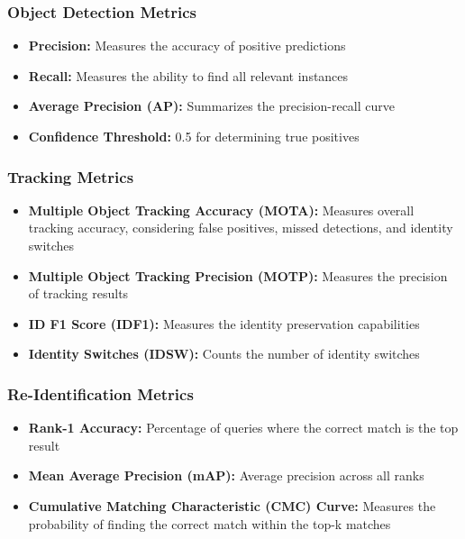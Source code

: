\subsubsection{Object Detection Metrics}
\label{subsubsection:detection-metrics}

\begin{itemize}
    \item \textbf{Precision:} Measures the accuracy of positive predictions
    \item \textbf{Recall:} Measures the ability to find all relevant instances
    \item \textbf{Average Precision (AP):} Summarizes the precision-recall curve
    \item \textbf{Confidence Threshold:} 0.5 for determining true positives
\end{itemize}

\subsubsection{Tracking Metrics}
\label{subsubsection:tracking-metrics}

\begin{itemize}
    \item \textbf{Multiple Object Tracking Accuracy (MOTA):} Measures overall tracking accuracy, considering false positives, missed detections, and identity switches
    \item \textbf{Multiple Object Tracking Precision (MOTP):} Measures the precision of tracking results
    \item \textbf{ID F1 Score (IDF1):} Measures the identity preservation capabilities
    \item \textbf{Identity Switches (IDSW):} Counts the number of identity switches
\end{itemize}

\subsubsection{Re-Identification Metrics}
\label{subsubsection:reid-metrics}

\begin{itemize}
    \item \textbf{Rank-1 Accuracy:} Percentage of queries where the correct match is the top result
    \item \textbf{Mean Average Precision (mAP):} Average precision across all ranks
    \item \textbf{Cumulative Matching Characteristic (CMC) Curve:} Measures the probability of finding the correct match within the top-k matches
\end{itemize}

